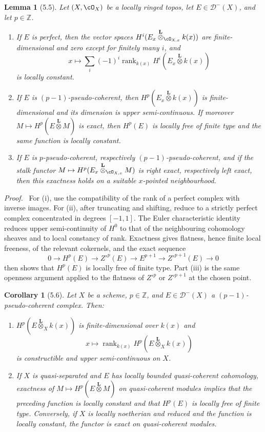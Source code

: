 \documentclass[11pt]{article}
\theoremstyle{plain}
\newtheorem*{lemma*}{Lemma}
\newtheorem*{corollary*}{Corollary}
\theoremstyle{definition}
\theoremstyle{remark}
\newenvironment{prooftext}{\par\noindent\textit{Proof.}\ }{\par\medskip}
\newcommand{\ZZ}{\mathbb Z}
\newcommand{\D}{\mathcal D}\newcommand{\E}{\mathcal E}\newcommand{\F}{\mathcal F}
\providecommand{\rg}{\operatorname{rank}}
\providecommand{\Ltens}{\overset{\mathbf L}{\otimes}}
\begin{document}
\begin{lemma*}[5.5]
Let $(X,\cO_X)$ be a locally ringed topos, let $E\in\D^-(X)$, and let $p\in\ZZ$.
\begin{enumerate}[label=(\roman*)]
\item If $E$ is perfect, then the vector spaces $H^i(E_x\Ltens_{\cO_{X,x}}k(x))$ are finite-dimensional and zero except for finitely many $i$, and
\[
x\mapsto\sum_i(-1)^i\rg_{k(x)}H^i(E_x\Ltens k(x))
\]
is locally constant.
\item If $E$ is $(p-1)$-pseudo-coherent, then $H^p(E_x\Ltens k(x))$ is finite-dimensional and its dimension is upper semi-continuous. If moreover $M\mapsto H^p(E\Ltens M)$ is exact, then $H^p(E)$ is locally free of finite type and the same function is locally constant.
\item If $E$ is $p$-pseudo-coherent, respectively $(p-1)$-pseudo-coherent, and if the stalk functor $M\mapsto H^p(E_x\Ltens_{\cO_{X,x}}M)$ is right exact, respectively left exact, then this exactness holds on a suitable $x$-pointed neighbourhood.
\end{enumerate}
\end{lemma*}

\begin{prooftext}
For (i), use the compatibility of the rank of a perfect complex with inverse images. For (ii), after truncating and shifting, reduce to a strictly perfect complex concentrated in degrees $[-1,1]$. The Euler characteristic identity reduces upper semi-continuity of $H^0$ to that of the neighbouring cohomology sheaves and to local constancy of rank. Exactness gives flatness, hence finite local freeness, of the relevant cokernels, and the exact sequence
\[
0\to H^p(E)\to Z'^p(E)\to E^{p+1}\to Z'^{p+1}(E)\to0
\]
then shows that $H^p(E)$ is locally free of finite type. Part (iii) is the same openness argument applied to the flatness of $Z'^p$ or $Z'^{p+1}$ at the chosen point.
\end{prooftext}

\begin{corollary*}[5.6]
Let $X$ be a scheme, $p\in\ZZ$, and $E\in\D^-(X)$ a $(p-1)$-pseudo-coherent complex. Then:
\begin{enumerate}[label=(\roman*)]
\item $H^p(E\Ltens_X k(x))$ is finite-dimensional over $k(x)$ and
\[
x\mapsto\rg_{k(x)}H^p(E\Ltens_X k(x))
\]
is constructible and upper semi-continuous on $X$.
\item If $X$ is quasi-separated and $E$ has locally bounded quasi-coherent cohomology, exactness of $M\mapsto H^p(E\Ltens M)$ on quasi-coherent modules implies that the preceding function is locally constant and that $H^p(E)$ is locally free of finite type. Conversely, if $X$ is locally noetherian and reduced and the function is locally constant, the functor is exact on quasi-coherent modules.
\end{enumerate}
\end{corollary*}
\end{document}
